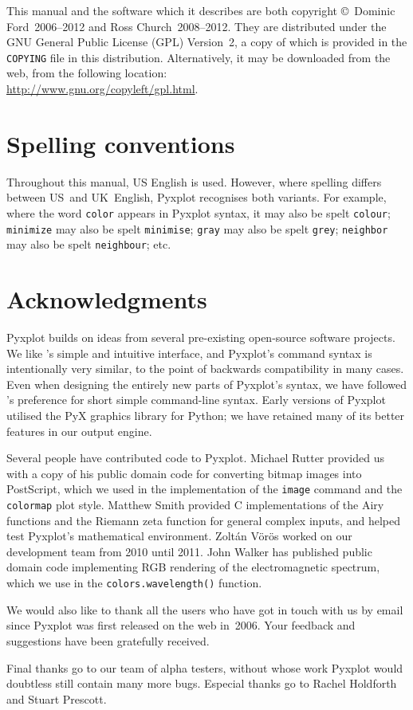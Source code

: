 This manual and the software which it describes are both copyright \copyright\
Dominic Ford~2006--2012 and Ross Church~2008--2012. They are distributed under
the GNU General Public License (GPL) Version~2, a copy of which is provided in
the {\tt COPYING} file in this distribution.\index{General Public
License}\index{license} Alternatively, it may be downloaded from the web, from
the following location:\\ \url{http://www.gnu.org/copyleft/gpl.html}.

\section{Spelling conventions}

Throughout this manual, US English is used. However, where spelling differs
between US~and UK~English, Pyxplot recognises both variants. For example, where
the word \texttt{color} appears in Pyxplot syntax, it may also be spelt
\texttt{colour}; \texttt{minimize} may also be spelt \texttt{minimise};
\texttt{gray} may also be spelt \texttt{grey}; \texttt{neighbor} may also be
spelt \texttt{neighbour}; etc.

\section{Acknowledgments}

Pyxplot builds on ideas from several pre-existing open-source software
projects. We like \gnuplot's simple and intuitive interface, and Pyxplot's
command syntax is intentionally very similar, to the point of backwards
compatibility in many cases. Even when designing the entirely new parts of
Pyxplot's syntax, we have followed \gnuplot's preference for short simple
command-line syntax.  Early versions of Pyxplot utilised the PyX
graphics library for Python; we have retained many of its better features in our
output engine.

Several people have contributed code to Pyxplot. Michael Rutter provided us 
with a copy of his public domain code for converting bitmap images into
PostScript, which we used in the implementation of the {\tt image} command and
the {\tt colormap} plot style. Matthew Smith provided C implementations of the
Airy functions and the Riemann zeta function for general complex inputs, and
helped test Pyxplot's mathematical environment. Zolt\'an V\"or\"os worked on
our development team from 2010 until 2011.  John Walker has published public
domain code implementing RGB rendering of the electromagnetic spectrum, which
we use in the {\tt colors.\-wave\-length()} function.

We would also like to thank all the users who have got in touch with us by
email since Pyxplot was first released on the web in~2006. Your feedback and
suggestions have been gratefully received.

Final thanks go to our team of alpha testers, without whose work Pyxplot would
doubtless still contain many more bugs.  Especial thanks go to Rachel Holdforth
and Stuart Prescott.

